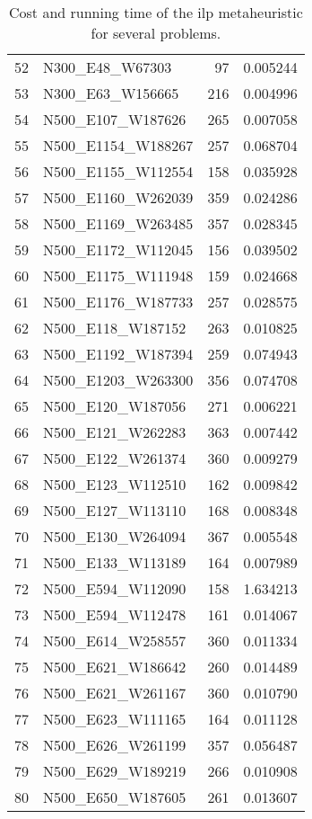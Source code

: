 \begin{table}
\begin{tabular}{llrr}
52 &     N300\_E48\_W67303 &    97 &          0.005244 \\
53 &    N300\_E63\_W156665 &   216 &          0.004996 \\
54 &   N500\_E107\_W187626 &   265 &          0.007058 \\
55 &  N500\_E1154\_W188267 &   257 &          0.068704 \\
56 &  N500\_E1155\_W112554 &   158 &          0.035928 \\
57 &  N500\_E1160\_W262039 &   359 &          0.024286 \\
58 &  N500\_E1169\_W263485 &   357 &          0.028345 \\
59 &  N500\_E1172\_W112045 &   156 &          0.039502 \\
60 &  N500\_E1175\_W111948 &   159 &          0.024668 \\
61 &  N500\_E1176\_W187733 &   257 &          0.028575 \\
62 &   N500\_E118\_W187152 &   263 &          0.010825 \\
63 &  N500\_E1192\_W187394 &   259 &          0.074943 \\
64 &  N500\_E1203\_W263300 &   356 &          0.074708 \\
65 &   N500\_E120\_W187056 &   271 &          0.006221 \\
66 &   N500\_E121\_W262283 &   363 &          0.007442 \\
67 &   N500\_E122\_W261374 &   360 &          0.009279 \\
68 &   N500\_E123\_W112510 &   162 &          0.009842 \\
69 &   N500\_E127\_W113110 &   168 &          0.008348 \\
70 &   N500\_E130\_W264094 &   367 &          0.005548 \\
71 &   N500\_E133\_W113189 &   164 &          0.007989 \\
72 &   N500\_E594\_W112090 &   158 &          1.634213 \\
73 &   N500\_E594\_W112478 &   161 &          0.014067 \\
74 &   N500\_E614\_W258557 &   360 &          0.011334 \\
75 &   N500\_E621\_W186642 &   260 &          0.014489 \\
76 &   N500\_E621\_W261167 &   360 &          0.010790 \\
77 &   N500\_E623\_W111165 &   164 &          0.011128 \\
78 &   N500\_E626\_W261199 &   357 &          0.056487 \\
79 &   N500\_E629\_W189219 &   266 &          0.010908 \\
80 &   N500\_E650\_W187605 &   261 &          0.013607 \\
\bottomrule
\end{tabular}
\caption{Cost and running time of the ilp metaheuristic for several problems.}
\label{table:ilp-results}
\end{table}

